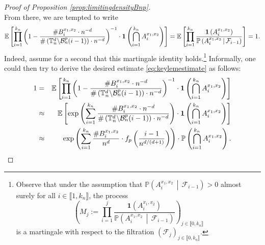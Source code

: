 \documentclass[a4paper,11pt]{article}
\begin{document}
\begin{proof}[Proof of Proposition \ref{prop:limitingdensityBnp}]
\begin{equation}
\end{equation}
From there, we are tempted to write
\begin{equation}\label{eq:mart}
\mathbb{E}\left[\prod_{i=1}^{k_n}\left(1-\frac{\#B_i^{x_1,x_2}\cdot n^{-d}}{\#\left(\mathbb{T}_n^d\middle\backslash\mathcal{B}_n^p(i-1)\right)\cdot n^{-d}}\right)^{-1}\cdot\mathbf{1}\left(\bigcap_{i=1}^{k_n}A_i^{x_1,x_2}\right)\right]=\mathbb{E}\left[\prod_{i=1}^{k_n}\frac{\mathbf{1}\left(A_i^{x_1,x_2}\right)}{\mathbb{P}\left(A_i^{x_1,x_2}\,\middle|\,\mathcal{F}_{i-1}\right)}\right]=1.
\end{equation}
Indeed, assume for a second that this martingale identity holds.\footnote{Observe that under the assumption that $\mathbb{P}\left(A_i^{x_1,x_2}\,\middle|\,\mathcal{F}_{i-1}\right)>0$ almost surely for all $i\in\llbracket1,k_n\rrbracket$, the process
\[\left(M_j:=\prod_{i=1}^j\frac{\mathbf{1}\left(A_i^{x_1,x_2}\right)}{\mathbb{P}\left(A_i^{x_1,x_2}\,\middle|\,\mathcal{F}_{i-1}\right)}\right)_{j\in\llbracket0,k_n\rrbracket}\]
is a martingale with respect to the filtration $(\mathcal{F}_j)_{j\in\llbracket0,k_n\rrbracket}$.}
Informally, one could then try to derive the desired estimate \eqref{eq:keylemestimate} as follows:
\begin{eqnarray}
1&=&\mathbb{E}\left[\prod_{i=1}^{k_n}\left(1-\frac{\#B_i^{x_1,x_2}\cdot n^{-d}}{\#\left(\mathbb{T}_n^d\middle\backslash\mathcal{B}_n^p(i-1)\right)\cdot n^{-d}}\right)^{-1}\cdot\mathbf{1}\left(\bigcap_{i=1}^{k_n}A_i^{x_1,x_2}\right)\right]\notag\\
&\approx&\mathbb{E}\left[\exp\left(\sum_{i=1}^{k_n}\frac{\#B_i^{x_1,x_2}\cdot n^{-d}}{\#\left(\mathbb{T}_n^d\middle\backslash\mathcal{B}_n^p(i-1)\right)\cdot n^{-d}}\right)\cdot\mathbf{1}\left(\bigcap_{i=1}^{k_n}A_i^{x_1,x_2}\right)\right]\notag\\
&\approx&\exp\left(\sum_{i=1}^{k_n}\frac{\#B_i^{x_1,x_2}}{n^d}\cdot f_p\left(\frac{i-1}{n^{d/(d+1)}}\right)\right)\cdot\mathbb{P}\left(\bigcap_{i=1}^{k_n}A_i^{x_1,x_2}\right).\label{eq:onaurait}
\end{eqnarray}

\end{proof}
\end{document}

